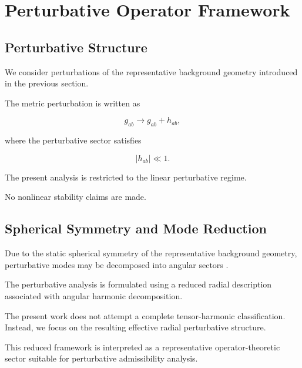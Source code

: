 
\section{Perturbative Operator Framework}

\subsection{Perturbative Structure}

We consider perturbations of the representative background geometry introduced in the previous section.

The metric perturbation is written as

\begin{equation}
g_{ab}
\rightarrow
g_{ab} + h_{ab},
\end{equation}

where the perturbative sector satisfies

\begin{equation}
|h_{ab}| \ll 1.
\end{equation}

The present analysis is restricted to the linear perturbative regime.

No nonlinear stability claims are made.


\subsection{Spherical Symmetry and Mode Reduction}

Due to the static spherical symmetry of the representative background geometry, perturbative modes may be decomposed into angular sectors \cite{reggewheeler1957,zerilli1970,vishveshwara1970}.

The perturbative analysis is formulated using a reduced radial description associated with angular harmonic decomposition.

The present work does not attempt a complete tensor-harmonic classification. Instead, we focus on the resulting effective radial perturbative structure.

This reduced framework is interpreted as a representative operator-theoretic sector suitable for perturbative admissibility analysis.

